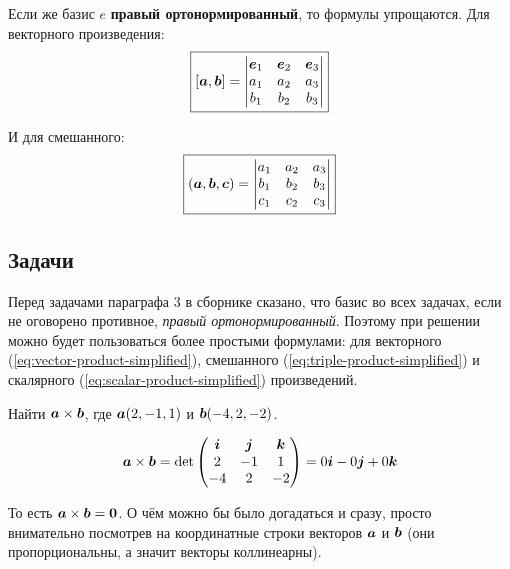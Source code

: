 \documentclass[a4paper,12pt]{article}
\begin{document}
  Если же базис $e$ \textbf{правый ортонормированный}, то формулы упрощаются.
  Для векторного произведения:
  \begin{equation}\label{eq:vector-product-simplified}
    \boxed{[\boldsymbol a, \boldsymbol b] = \begin{vmatrix}
      \boldsymbol e_1 & \boldsymbol e_2 & \boldsymbol e_3\\
      a_1 & a_2 & a_3\\
      b_1 & b_2 & b_3
    \end{vmatrix}}
  \end{equation}
  
  И для смешанного:
  \begin{equation}\label{eq:triple-product-simplified}
    \boxed{(\boldsymbol a, \boldsymbol b, \boldsymbol c) = \begin{vmatrix}
      a_1 & a_2 & a_3\\
      b_1 & b_2 & b_3\\
      c_1 & c_2 & c_3
    \end{vmatrix}}
  \end{equation}
  
  
  \subsection{Задачи}
  
  Перед задачами параграфа $3$ в сборнике сказано, что базис во всех задачах, если не оговорено противное, \emph{правый ортонормированный}.
  Поэтому при решении можно будет пользоваться более простыми формулами: для векторного (\ref{eq:vector-product-simplified}), смешанного (\ref{eq:triple-product-simplified}) и скалярного (\ref{eq:scalar-product-simplified}) произведений.
  
  
  \begin{problem}[3.1(2)]
    Найти $\boldsymbol a \times \boldsymbol b$, где $\boldsymbol a(2, -1, 1)$ и $\boldsymbol b(-4, 2, -2)$.  %
  \end{problem}
  
  \begin{solution}
    \[
      \boldsymbol a \times \boldsymbol b = \det \begin{pmatrix}
        \boldsymbol i & \boldsymbol j & \boldsymbol k\\
        2      & -1     & 1\\
        -4     & 2      & -2
      \end{pmatrix}
      = 0 \boldsymbol i - 0 \boldsymbol j + 0 \boldsymbol k
    \]
    
    То есть $\bds a \hm\times \bds b \hm= \bds 0$.
    О чём можно бы было догадаться и сразу, просто внимательно посмотрев на координатные строки векторов $\boldsymbol a$ и $\boldsymbol b$ (они пропорциональны, а значит векторы коллинеарны).
  \end{solution}
  
\end{document}
